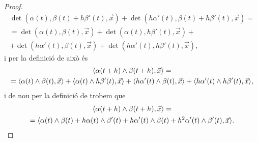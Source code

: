 \documentclass[../../main.tex]{subfiles}
\begin{document}
\begin{proposition}
\begin{proof}
            \begin{multline*}
                \det(\alpha(t),\beta(t)+h\beta'(t),\vec{x})+\det(h\alpha'(t),\beta(t)+h\beta'(t),\vec{x})=\\
                =\det(\alpha(t),\beta(t),\vec{x})+\det(\alpha(t),h\beta'(t),\vec{x})+\\
                +\det(h\alpha'(t),\beta(t),\vec{x})+\det(h\alpha'(t),h\beta'(t),\vec{x}),
            \end{multline*}
            i per la definició de  això és
            \begin{multline*}
                \prodesc{\alpha(t+h)\prodvec\beta(t+h)}{\vec{x}}=\\
                =\prodesc{\alpha(t)\prodvec\beta(t)}{\vec{x}}+\prodesc{\alpha(t)\prodvec h\beta'(t)}{\vec{x}}+\prodesc{h\alpha'(t)\prodvec\beta(t)}{\vec{x}}+\prodesc{h\alpha'(t)\prodvec h\beta'(t)}{\vec{x}},
            \end{multline*}
            i de nou per la definició de  trobem que
            \begin{multline*}
                \prodesc{\alpha(t+h)\prodvec\beta(t+h)}{\vec{x}}=\\
                =\prodesc{\alpha(t)\prodvec\beta(t)+h\alpha(t)\prodvec\beta'(t)+h\alpha'(t)\prodvec\beta(t)+h^{2}\alpha'(t)\prodvec \beta'(t)}{\vec{x}}.
            \end{multline*}


\end{proof}
\end{proposition}
\end{document}
